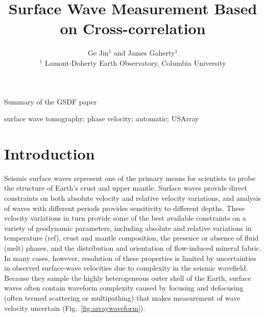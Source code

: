 \documentclass[referee]{gji}
\title[Surface Wave Measurement Based on Cross-correlation]
	{Surface Wave Measurement Based on Cross-correlation}
\author[Ge Jin and James Gaherty]
  {Ge Jin$^1$ and James Gaherty$^1$ \\
  $^1$ Lamont-Doherty Earth Observatory, Columbia University
  }
\date{}
\begin{document}
\label{firstpage}

\maketitle


\begin{summary}
	Summary of the GSDF paper
\end{summary}

\begin{keywords}
	 surface wave tomography; phase velocity; automatic; USArray
\end{keywords}

\section{Introduction}

Seismic surface waves represent one of the primary means for scientists to probe the structure of Earth's crust and upper mantle.  Surface waves provide direct constraints on both absolute velocity and relative velocity variations, and analysis of waves with different periods provides sensitivity to different depths.  These velocity variations in turn provide some of the best available constraints on a variety of geodynamic parameters, including absolute and relative variations in temperature (ref), crust and mantle composition, the presence or absence of fluid (melt) phases, and the distribution and orientation of flow-induced mineral fabric.  In many cases, however, resolution of these properties is limited by uncertainties in observed surface-wave velocities due to complexity in the seismic wavefield.  Because they sample the highly heterogeneous outer shell of the Earth, surface waves often contain waveform complexity caused by focusing and defocusing (often termed scattering or multipathing) that makes measurement of wave velocity uncertain (Fig.~\ref{fig:arraywaveform}). 
\end{document}
